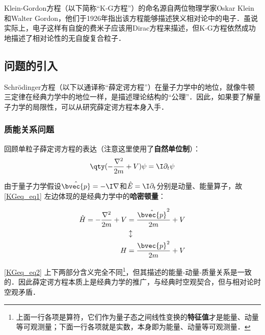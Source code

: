 


Klein-Gordon方程（以下简称“K-G方程”）的命名源自两位物理学家Oskar Klein和Walter Gordon，他们于1926年指出该方程能够描述狭义相对论中的电子．虽说实际上，电子这样有自旋的费米子应该用Dirac方程来描述，但K-G方程依然成功地描述了相对论性的无自旋复合粒子．



\subsection{问题的引入}

Schrödinger方程（以下以通译称“薛定谔方程”）在量子力学中的地位，就像牛顿三定律在经典力学中的地位一样，是描述理论结构的“公理”．因此，如果要了解量子力学的局限性，可以从研究薛定谔方程本身入手．

\subsubsection{质能关系问题}

回顾单粒子薛定谔方程的表达（注意这里使用了\textbf{自然单位制}）：
\begin{equation}\label{KGeq_eq1}
\qty(-\frac{\nabla^2}{2m}+V)\psi = \I \partial_t \psi
\end{equation}

由于量子力学假设$\hat{\bvec{p}}=-\I\nabla$和$\hat{E}=\I\partial_t$分别是动量、能量算子，故\autoref{KGeq_eq1} 左边体现的是经典力学中的\textbf{哈密顿量}：

\begin{equation}\label{KGeq_eq2}
\begin{aligned}
\hat{H}=-\frac{\nabla^2}{2m}+V &= \frac{\hat{\bvec{p}}^2}{2m}+V \\
&\updownarrow\\
H &= \frac{\bvec{p}^2}{2m}+V
\end{aligned}
\end{equation}

\autoref{KGeq_eq2} 上下两部分含义完全不同\footnote{上面一行各项是算符，它们作为量子态之间线性变换的\textbf{特征值}才是能量、动量等可观测量；下面一行各项就是实数，本身即为能量、动量等可观测量．}，但其描述的能量-动量-质量关系是一致的．因此薛定谔方程本质上是经典力学的推广，与经典时空观契合，但与相对论时空观矛盾．

